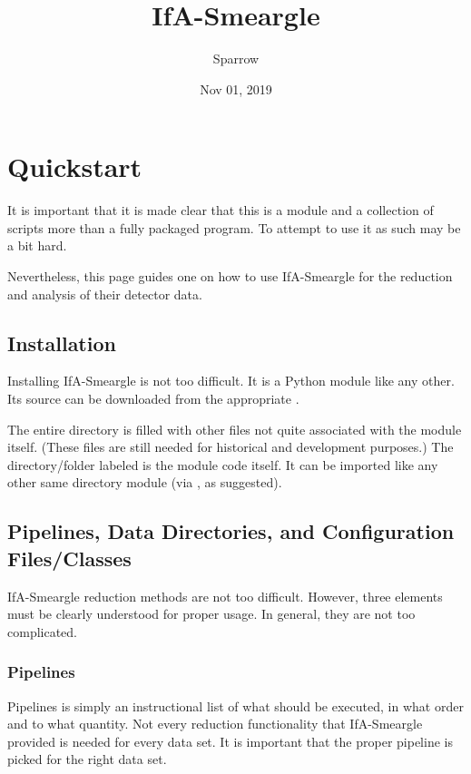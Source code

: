 \documentclass[letterpaper,10pt,english]{sphinxmanual}
\title{IfA-Smeargle}
\date{Nov 01, 2019}
\author{Sparrow}
\begin{document}
\pagestyle{empty}
\sphinxmaketitle
\pagestyle{plain}
\sphinxtableofcontents
\pagestyle{normal}
\label{\detokenize{index::doc}}



\chapter{Quickstart}
\label{\detokenize{quickstart:quickstart}}\label{\detokenize{quickstart::doc}}
It is important that it is made clear that this is a module and a collection
of scripts more than a fully packaged program. To attempt to use it as such
may be a bit hard.

Nevertheless, this page guides one on how to use IfA-Smeargle for the
reduction and analysis of their detector data.


\section{Installation}
\label{\detokenize{quickstart:installation}}
Installing IfA-Smeargle is not too difficult. It is a Python module like any
other. Its source can be downloaded from the appropriate .

The entire directory is filled with other files not quite associated
with the module itself. (These files are still needed for historical and
development purposes.) The directory/folder labeled  is the
module code itself. It can be imported like any other same directory module
(via , as suggested).


\section{Pipelines, Data Directories, and Configuration Files/Classes}
\label{\detokenize{quickstart:pipelines-data-directories-and-configuration-files-classes}}
IfA-Smeargle reduction methods are not too difficult. However,
three elements must be clearly understood for proper usage. In general, they
are not too complicated.


\subsection{Pipelines}
\label{\detokenize{quickstart:pipelines}}
Pipelines is simply an instructional list of what should be executed, in
what order and to what quantity. Not every reduction functionality that
IfA-Smeargle provided is needed for every data set. It is important that
the proper pipeline is picked for the right data set.
\end{document}

